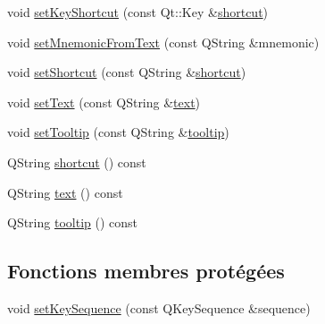 \begin{DoxyCompactItemize}
void \hyperlink{classSH__ExtendedQQmlAction_a009073e1d5001219d34c0cd22a9e9a09}{set\-Key\-Shortcut} (const Qt\-::\-Key \&\hyperlink{classSH__ExtendedQQmlAction_ab5214480c7405fb7b58115c2bcbf3c97}{shortcut})
\item 
void \hyperlink{classSH__ExtendedQQmlAction_ae2ef95196ee3b14e505f0d028e60b8d8}{set\-Mnemonic\-From\-Text} (const Q\-String \&mnemonic)
\item 
void \hyperlink{classSH__ExtendedQQmlAction_a2153c886f7663d5a714c354a05c8b855}{set\-Shortcut} (const Q\-String \&\hyperlink{classSH__ExtendedQQmlAction_ab5214480c7405fb7b58115c2bcbf3c97}{shortcut})
\item 
void \hyperlink{classSH__ExtendedQQmlAction_af0b32d40b7195ad38b0348cec6dd7c70}{set\-Text} (const Q\-String \&\hyperlink{classSH__ExtendedQQmlAction_a825f1dfa0bc5b419c9cebf9038eb0da1}{text})
\item 
void \hyperlink{classSH__ExtendedQQmlAction_a2368d82145d8f268af41ee5cb6d540d4}{set\-Tooltip} (const Q\-String \&\hyperlink{classSH__ExtendedQQmlAction_a23d20fc1d01dfee175ac978032e75181}{tooltip})
\item 
Q\-String \hyperlink{classSH__ExtendedQQmlAction_a070cac95bfc43b184ca1f0a75592877b}{shortcut} () const 
\item 
Q\-String \hyperlink{classSH__ExtendedQQmlAction_a827915b0ce23a1af60d9aaaf7d052447}{text} () const 
\item 
Q\-String \hyperlink{classSH__ExtendedQQmlAction_ac703f5c565bd0c7a0892627885042f0c}{tooltip} () const 
\end{DoxyCompactItemize}
\subsection*{Fonctions membres protégées}
\begin{DoxyCompactItemize}
\item 
void \hyperlink{classSH__ExtendedQQmlAction_a33a3ff960a56b08d97afd9ed5351cf68}{set\-Key\-Sequence} (const Q\-Key\-Sequence \&sequence)
\end{DoxyCompactItemize}
